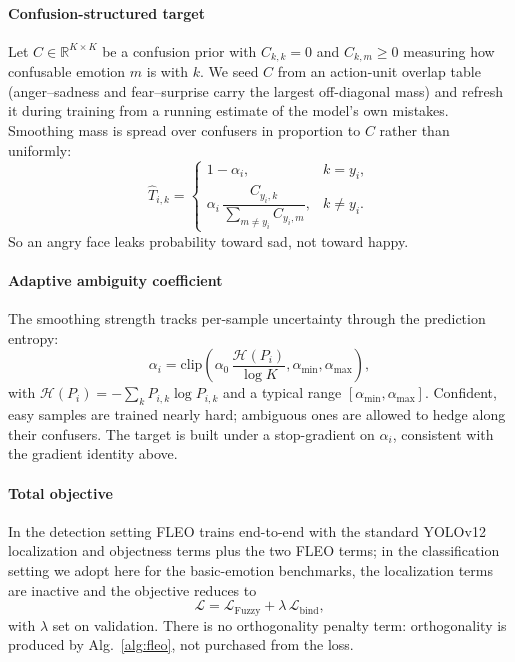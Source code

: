 \documentclass[journal]{IEEEtran}
\begin{document}
\paragraph*{Confusion-structured target}
Let $C\in\mathbb{R}^{K\times K}$ be a confusion prior with $C_{k,k}=0$ and
$C_{k,m}\ge 0$ measuring how confusable emotion $m$ is with $k$. We seed $C$
from an action-unit overlap table (anger--sadness and fear--surprise carry the
largest off-diagonal mass) and refresh it during training from a running
estimate of the model's own mistakes. Smoothing mass is spread over confusers
in proportion to $C$ rather than uniformly:
\begin{equation}\label{eq:target}
\hat{T}_{i,k}=
\begin{cases}
1-\alpha_i, & k=y_i,\\[4pt]
\alpha_i\,\dfrac{C_{y_i,k}}{\sum_{m\neq y_i}C_{y_i,m}}, & k\neq y_i.
\end{cases}
\end{equation}
So an angry face leaks probability toward sad, not toward happy.

\paragraph*{Adaptive ambiguity coefficient}
The smoothing strength tracks per-sample uncertainty through the prediction
entropy:
\begin{equation}\label{eq:alpha}
\alpha_i = \text{clip}\!\left(\alpha_0\,\frac{\mathcal{H}(P_i)}{\log K},
\alpha_\text{min},\alpha_\text{max}\right),
\end{equation}
with $\mathcal{H}(P_i)=-\sum_k P_{i,k}\log P_{i,k}$ and a typical range
$[\alpha_\text{min},\alpha_\text{max}]$. Confident, easy samples are trained
nearly hard; ambiguous ones are allowed to hedge along their confusers. The
target is built under a stop-gradient on $\alpha_i$, consistent with the
gradient identity above.

\paragraph*{Total objective}
In the detection setting FLEO trains end-to-end with the standard YOLOv12
localization and objectness terms plus the two FLEO terms; in the
classification setting we adopt here for the basic-emotion benchmarks, the
localization terms are inactive and the objective reduces to
\begin{equation}\label{eq:total}
\mathcal{L} = \mathcal{L}_\text{Fuzzy} + \lambda\,\mathcal{L}_\text{bind},
\end{equation}
with $\lambda$ set on validation. There is no orthogonality penalty term:
orthogonality is produced by Alg.~\ref{alg:fleo}, not purchased from the loss.
\end{document}
